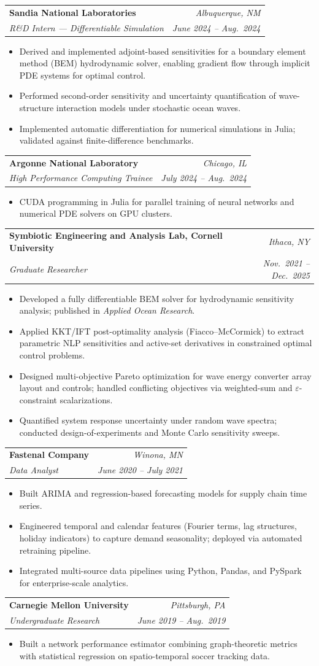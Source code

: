 \documentclass[letterpaper,11pt]{article}
\makeatletter
\newcommand{\resumeItem}[1]{%
  \item\small{#1\vspace{1pt}}%
}
\newcommand{\resumeSubheading}[4]{%
  \vspace{2pt}\item
    \begin{tabular*}{0.97\textwidth}[t]{l@{\extracolsep{\fill}}r}
      \textbf{\color{darkgray}\normalsize #1} & \small\textit{\color{medgray}#2} \\[1pt]
      \textit{\small\color{medgray}#3} & \textit{\small\color{medgray}#4} \\
    \end{tabular*}\vspace{-3pt}%
}
\newcommand{\resumeItemListStart}{\begin{itemize}[leftmargin=0.22in,topsep=3pt,itemsep=2pt,parsep=0pt]}
\newcommand{\resumeItemListEnd}{\end{itemize}\vspace{-2pt}}
\makeatother
\begin{document}
  \resumeSubheading
    {Sandia National Laboratories}{Albuquerque, NM}
    {R\&D Intern --- Differentiable Simulation}{June 2024 -- Aug.\ 2024}
  \resumeItemListStart
    \resumeItem{Derived and implemented adjoint-based sensitivities for a boundary element method (BEM) hydrodynamic solver, enabling gradient flow through implicit PDE systems for optimal control.}
    \resumeItem{Performed second-order sensitivity and uncertainty quantification of wave-structure interaction models under stochastic ocean waves.}
    \resumeItem{Implemented automatic differentiation for numerical simulations in Julia; validated against finite-difference benchmarks.}
  \resumeItemListEnd

  \resumeSubheading
    {Argonne National Laboratory}{Chicago, IL}
    {High Performance Computing Trainee}{July 2024 -- Aug.\ 2024}
  \resumeItemListStart
    \resumeItem{CUDA programming in Julia for parallel training of neural networks and numerical PDE solvers on GPU clusters.}
  \resumeItemListEnd

  \resumeSubheading
    {Symbiotic Engineering and Analysis Lab, Cornell University}{Ithaca, NY}
    {Graduate Researcher}{Nov.\ 2021 -- Dec.\ 2025}
  \resumeItemListStart
    \resumeItem{Developed a fully differentiable BEM solver for hydrodynamic sensitivity analysis; published in \textit{Applied Ocean Research}.}
    \resumeItem{Applied KKT/IFT post-optimality analysis (Fiacco--McCormick) to extract parametric NLP sensitivities and active-set derivatives in constrained optimal control problems.}
    \resumeItem{Designed multi-objective Pareto optimization for wave energy converter array layout and controls; handled conflicting objectives via weighted-sum and $\varepsilon$-constraint scalarizations.}
    \resumeItem{Quantified system response uncertainty under random wave spectra; conducted design-of-experiments and Monte Carlo sensitivity sweeps.}
  \resumeItemListEnd

  \resumeSubheading
    {Fastenal Company}{Winona, MN}
    {Data Analyst}{June 2020 -- July 2021}
  \resumeItemListStart
    \resumeItem{Built ARIMA and regression-based forecasting models for supply chain time series.}
    \resumeItem{Engineered temporal and calendar features (Fourier terms, lag structures, holiday indicators) to capture demand seasonality; deployed via automated retraining pipeline.}
    \resumeItem{Integrated multi-source data pipelines using Python, Pandas, and PySpark for enterprise-scale analytics.}
  \resumeItemListEnd

  \resumeSubheading
    {Carnegie Mellon University}{Pittsburgh, PA}
    {Undergraduate Research}{June 2019 -- Aug.\ 2019}
  \resumeItemListStart
    \resumeItem{Built a network performance estimator combining graph-theoretic metrics with statistical regression on spatio-temporal soccer tracking data.}
  \resumeItemListEnd
\end{document}
